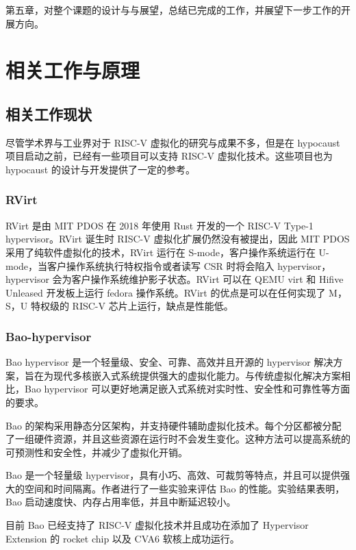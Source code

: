 第五章，对整个课题的设计与与展望，总结已完成的工作，并展望下一步工作的开展方向。


\chapter{相关工作与原理}
\section{相关工作现状}
尽管学术界与工业界对于 RISC-V 虚拟化的研究与成果不多，但是在 hypocaust 项目启动之前，已经有一些项目可以支持 RISC-V 虚拟化技术。这些项目也为 hypocaust 的设计与开发提供了一定的参考。

\subsection{RVirt}
RVirt 是由 MIT PDOS 在 2018 年使用 Rust 开发的一个 RISC-V Type-1 hypervisor。RVirt 诞生时 RISC-V 虚拟化扩展仍然没有被提出，因此 MIT PDOS 采用了纯软件虚拟化的技术，RVirt 运行在 S-mode，客户操作系统运行在 U-mode，当客户操作系统执行特权指令或者读写 CSR 时将会陷入 hypervisor，hypervisor 会为客户操作系统维护影子状态。RVirt 可以在 QEMU virt 和 Hifive Unleased 开发板上运行 fedora 操作系统。RVirt 的优点是可以在任何实现了 M，S，U 特权级的 RISC-V 芯片上运行，缺点是性能低。

\subsection{Bao-hypervisor}
Bao hypervisor\cite{martins2020bao} 是一个轻量级、安全、可靠、高效并且开源的 hypervisor 解决方案，旨在为现代多核嵌入式系统提供强大的虚拟化能力。与传统虚拟化解决方案相比，Bao hypervisor 可以更好地满足嵌入式系统对实时性、安全性和可靠性等方面的要求。

Bao 的架构采用静态分区架构，并支持硬件辅助虚拟化技术。每个分区都被分配了一组硬件资源，并且这些资源在运行时不会发生变化。这种方法可以提高系统的可预测性和安全性，并减少了虚拟化开销。

Bao 是一个轻量级 hypervisor，具有小巧、高效、可裁剪等特点，并且可以提供强大的空间和时间隔离。作者进行了一些实验来评估 Bao 的性能。实验结果表明，Bao 启动速度快、内存占用率低，并且中断延迟较小。

目前 Bao 已经支持了 RISC-V 虚拟化技术并且成功在添加了 Hypervisor Extension 的 rocket chip 以及 CVA6 软核上成功运行。\cite{sa2021first,asanovic2016rocket,sa2023cva6}

